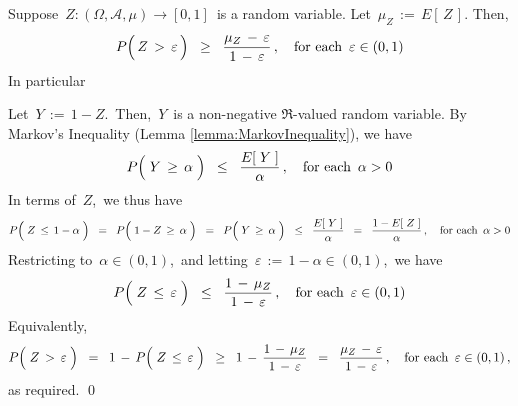 
\vskip 1.0cm
\begin{corollary}
\label{corollary:MarkovLemma}
\mbox{}\vskip 0.2cm
\noindent
Suppose \,$Z : (\Omega,\mathcal{A},\mu) \longrightarrow [0,1]$\,
is a random variable. Let \,$\mu_{Z} \,:=\, E\!\left[\,Z\,\right]$.
Then,
\begin{equation*}
P\!\left(\,Z \,\overset{{\color{white}.}}{>}\, \varepsilon\,\right)
\;\; \geq \;\;
	\dfrac{\mu_{Z} \,-\, \varepsilon}{1\,-\,\varepsilon}\,,
\quad
\textnormal{for each \,$\varepsilon \in (0,1)$}
\end{equation*}
In particular
\end{corollary}
\proof
Let \,$Y \,:=\, 1 - Z$.\, Then, \,$Y$\, is a non-negative $\Re$-valued random variable.
By Markov's Inequality (Lemma \ref{lemma:MarkovInequality}), we have
\begin{equation*}
P\!\left(\; Y \,\overset{{\color{white}.}}{\geq}\, \alpha \;\right)
\;\; \leq \;\;
	\dfrac{ E\!\left[\; Y \;\right] }{ \alpha }\,,
\quad
\textnormal{for each \,$\alpha > 0$}
\end{equation*}
In terms of \,$Z$,\, we thus have
\begin{equation*}
P\!\left(\; Z \,\overset{{\color{white}.}}{\leq}\, 1 - \alpha \;\right)
\;\; = \;\;
	P\!\left(\; 1 - Z \,\overset{{\color{white}.}}{\geq}\, \alpha \;\right)
\;\; = \;\;
	P\!\left(\; Y \,\overset{{\color{white}.}}{\geq}\, \alpha \;\right)
\;\; \leq \;\;
	\dfrac{ E\!\left[\; Y \;\right] }{ \alpha }
\;\; = \;\;
	\dfrac{ 1 - E\!\left[\; Z \;\right] }{ \alpha }\,,
\quad
\textnormal{for each \,$\alpha > 0$}
\end{equation*}
Restricting to \,$\alpha \in (0,1)$,\, and letting \,$\varepsilon \,:=\, 1 - \alpha \in (0,1)$,\, we have
\begin{equation*}
P\!\left(\; Z \,\overset{{\color{white}.}}{\leq}\, \varepsilon \;\right)
\;\; \leq \;\;
	\dfrac{ 1 \,-\, \mu_{Z} }{ 1 \,-\, \varepsilon }\,,
\quad
\textnormal{for each \,$\varepsilon \in (0,1)$}
\end{equation*}
Equivalently,
\begin{equation*}
P\!\left(\; Z \,\overset{{\color{white}.}}{>}\, \varepsilon \;\right)
\;\; = \;\;
	1 \,-\, P\!\left(\; Z \,\overset{{\color{white}.}}{\leq}\, \varepsilon \;\right)
\;\; \geq \;\;
	1 \,-\, \dfrac{ 1 \,-\, \mu_{Z} }{ 1 \,-\, \varepsilon }
\;\; = \;\;
	\dfrac{ \mu_{Z} \,-\, \varepsilon }{ 1 \,-\, \varepsilon }\,,
\quad
\textnormal{for each \,$\varepsilon \in (0,1)$}\,,
\end{equation*}
as required.
\qed

